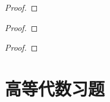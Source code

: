 \documentclass[lang=cn,newtx,10pt,scheme=chinese]{../Template/elegantbook}
\begin{document}
\begin{example}

\end{example}
\begin{proof}

\end{proof}

\begin{example}

\end{example}
\begin{proof}

\end{proof}

\begin{example}

\end{example}
\begin{proof}

\end{proof}







\chapter{高等代数习题}
\end{document}

